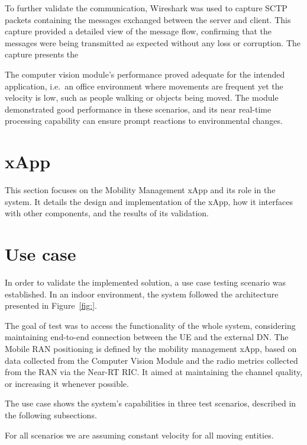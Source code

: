 To further validate the communication, Wireshark was used to capture SCTP packets containing the messages exchanged between the server and client.
This capture provided a detailed view of the message flow, confirming that the messages were being transmitted as expected without any loss or corruption.
The capture presents the





The computer vision module's performance proved adequate for the intended application, i.e.\ an office environment where movements are frequent yet the velocity is low, such as people walking or objects being moved.
The module demonstrated good performance in these scenarios, and its near real-time processing capability can ensure prompt reactions to environmental changes.



\section{xApp}\label{sec:mm_xapp}
This section focuses on the Mobility Management xApp and its role in the system.
It details the design and implementation of the xApp, how it interfaces with other components, and the results of its validation.

\section{Use case}\label{sec:use_case}
In order to validate the implemented solution, a use case testing scenario was established.
In an indoor environment, the system followed the architecture presented in Figure~\ref{fig:}.

The goal of test was to access the functionality of the whole system, considering maintaining end-to-end connection between the UE and the external DN. The Mobile RAN positioning is defined by the mobility management xApp, based on data collected from the Computer Vision Module and the radio metrics collected from the RAN via the Near-RT RIC. It aimed at maintaining the channel quality, or increasing it whenever possible.

The use case shows the system's capabilities in three test scenarios, described in the following subsections.

For all scenarios we are assuming constant velocity for all moving entities.

